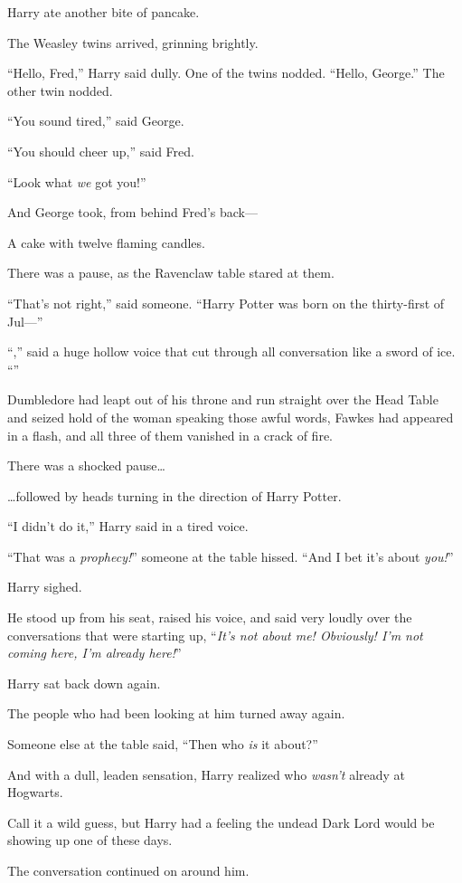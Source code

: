 Harry ate another bite of pancake.

The Weasley twins arrived, grinning brightly.

“Hello, Fred,” Harry said dully. One of the twins nodded. “Hello, George.” The
other twin nodded.

“You sound tired,” said George.

“You should cheer up,” said Fred.

“Look what \emph{we} got you!”

And George took, from behind Fred’s back—

A cake with twelve flaming candles.

There was a pause, as the Ravenclaw table stared at them.

“That’s not right,” said someone. “Harry Potter was born on the thirty-first of
Jul—”

“,” said a huge hollow voice that cut through all
conversation like a sword of ice. “”

Dumbledore had leapt out of his throne and run straight over the Head Table and
seized hold of the woman speaking those awful words, Fawkes had appeared in a
flash, and all three of them vanished in a crack of fire.

There was a shocked pause…

…followed by heads turning in the direction of Harry Potter.

“I didn’t do it,” Harry said in a tired voice.

“That was a \emph{prophecy!}” someone at the table hissed. “And I bet it’s
about \emph{you!}”

Harry sighed.

He stood up from his seat, raised his voice, and said very loudly over the
conversations that were starting up, “\emph{It’s not about me! Obviously! I’m
not coming here, I’m already here!}”

Harry sat back down again.

The people who had been looking at him turned away again.

Someone else at the table said, “Then who \emph{is} it about?”

And with a dull, leaden sensation, Harry realized who \emph{wasn’t} already at
Hogwarts.

Call it a wild guess, but Harry had a feeling the undead Dark Lord would be
showing up one of these days.

The conversation continued on around him.

